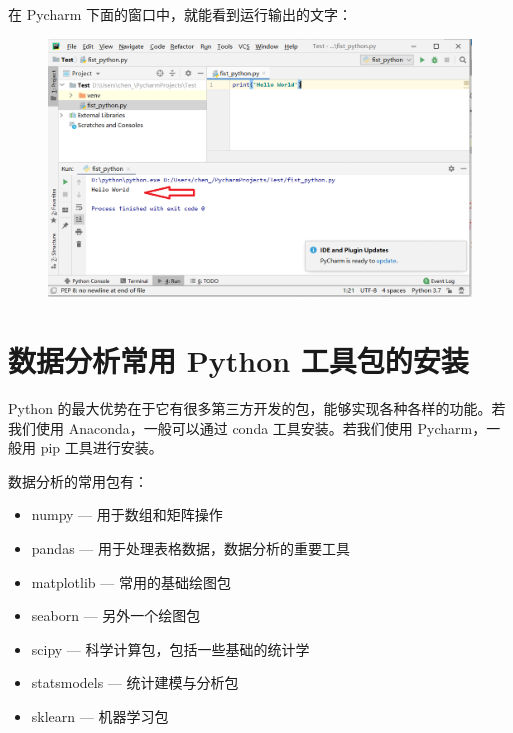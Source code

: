 在 Pycharm 下面的窗口中，就能看到运行输出的文字：

\begin{figure}[!ht]
  \centering
  \includegraphics[scale=0.5]{figure/chapter1/pycharm18.png}
\end{figure}

\clearpage
\section{数据分析常用 Python 工具包的安装}

Python 的最大优势在于它有很多第三方开发的包，能够实现各种各样的功能。若我们使用 Anaconda，一般可以通过 conda 工具安装。若我们使用 Pycharm，一般用 pip 工具进行安装。

数据分析的常用包有：

\vspace{5pt}
\begin{itemize}
  \item numpy --- 用于数组和矩阵操作

  \item pandas --- 用于处理表格数据，数据分析的重要工具

  \item matplotlib --- 常用的基础绘图包

  \item seaborn --- 另外一个绘图包

  \item scipy --- 科学计算包，包括一些基础的统计学

  \item statsmodels --- 统计建模与分析包

  \item sklearn --- 机器学习包




\end{itemize}
\vspace{5pt}

